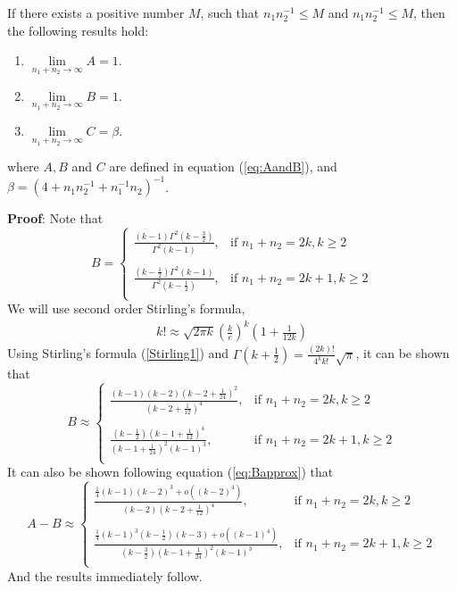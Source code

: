 \begin{lemma}\label{lemmaLimit}
	If there exists a positive number $M$, such that  $n_1n_2^{-1}\leq M$ and $n_1n_2^{-1}\leq 
	M$, then the following results hold:
	\begin{enumerate}
		\item $\lim\limits_{n_1 + n_2\rightarrow \infty} A = 1$.
		\item $\lim\limits_{n_1 + n_2\rightarrow \infty} B = 1$.
		\item $\lim\limits_{n_1 + n_2\rightarrow \infty} C = \beta.$
	\end{enumerate}
	where  $A, B$ and $C$ are defined in equation (\ref{eq:AandB}), and $\beta= (4 + 
	n_1n_2^{-1} + n_1^{-1}n_2)^{-1}$. 
\end{lemma}
\textbf{Proof}: Note that 
\begin{equation}
B = 
\begin{cases}
\frac{(k-1)\Gamma^2(k- \frac{3}{2})}{\Gamma^2(k-1)},& \text{if } n_1 + n_2 = 2k, k\geq 2 \\
~\\
\frac{(k-\frac{1}{2})\Gamma^2(k- 1)}{\Gamma^2(k-\frac{1}{2})},& \text{if } n_1 + n_2 = 2k+1, 
k\geq 2 \\
\end{cases}
\end{equation}
We will use second order Stirling's formula,
\begin{align}\label{Stirling1}
k! \approx \sqrt{2\pi k}\left(\frac{k}{e}\right)^k(1 + \frac{1}{12k})
\end{align}
Using Stirling's formula (\ref{Stirling1}) and  $\Gamma(k + \frac{1}{2}) =
\frac{(2k)!}{4^kk!}\sqrt{\pi}$, it can be shown that 
\begin{equation}\label{eq:Bapprox}
B \approx  
\begin{cases}
\frac{(k-1)(k-2)(k-2 + \frac{1}{24})^2}{(k-2 + \frac{1}{12})^4},& \text{if } n_1 + n_2 = 2k, 
k\geq 2 \\
~\\
\frac{(k-\frac{1}{2})(k - 1 + \frac{1}{12})^4}{(k-1+ \frac{1}{24})^2(k-1)^3},& \text{if } n_1 + 
n_2 = 2k+1, k\geq 2 \\
\end{cases}
\end{equation}
It can also be shown following equation (\ref{eq:Bapprox}) that
\begin{equation}\label{eq:AminusB}
A- B \approx  
\begin{cases}
\frac{\frac{1}{4}(k-1)(k-2)^3 + o((k-2)^4)}{(k-2)(k-2 + \frac{1}{12})^4},& \text{if } n_1 + n_2 
= 2k, k\geq 2 \\
~\\
\frac{\frac{1}{4}(k-1)^3(k-\frac{1}{2})(k-3) + o((k-1)^4)}{(k-\frac{3}{2})(k-1+ 
	\frac{1}{24})^2(k-1)^3},& \text{if } n_1 + n_2 = 2k+1, k\geq 2 \\
\end{cases}
\end{equation}
And the results immediately follow.

